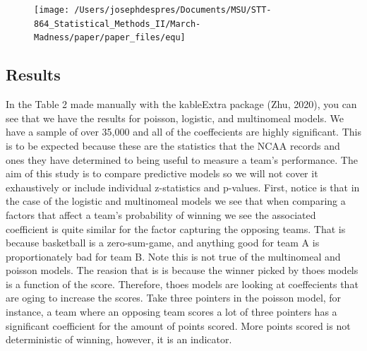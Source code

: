 \documentclass[
  man,floatsintext]{apa6}
\begin{document}
\begin{figure}
\texttt{[image: /Users/josephdespres/Documents/MSU/STT-864\_Statistical\_Methods\_II/March-Madness/paper/paper\_files/equ]} \end{figure}

\hypertarget{results}{%
\subsection{Results}\label{results}}

In the Table 2 made manually with the kableExtra package (Zhu, 2020), you can see that we have the results for poisson, logistic, and multinomeal models. We have a sample of over 35,000 and all of the coeffecients are highly significant. This is to be expected because these are the statistics that the NCAA records and ones they have determined to being useful to measure a team's performance. The aim of this study is to compare predictive models so we will not cover it exhaustively or include individual z-statistics and p-values.
First, notice is that in the case of the logistic and multinomeal models we see that when comparing a factors that affect a team's probability of winning we see the associated coefficient is quite similar for the factor capturing the opposing teams. That is because basketball is a zero-sum-game, and anything good for team A is proportionately bad for team B. Note this is not true of the multinomeal and poisson models. The reasion that is is because the winner picked by thoes models is a function of the score. Therefore, thoes models are looking at coeffecients that are oging to increase the scores. Take three pointers in the poisson model, for instance, a team where an opposing team scores a lot of three pointers has a significant coefficient for the amount of points scored. More points scored is not deterministic of winning, however, it is an indicator.
\end{document}
